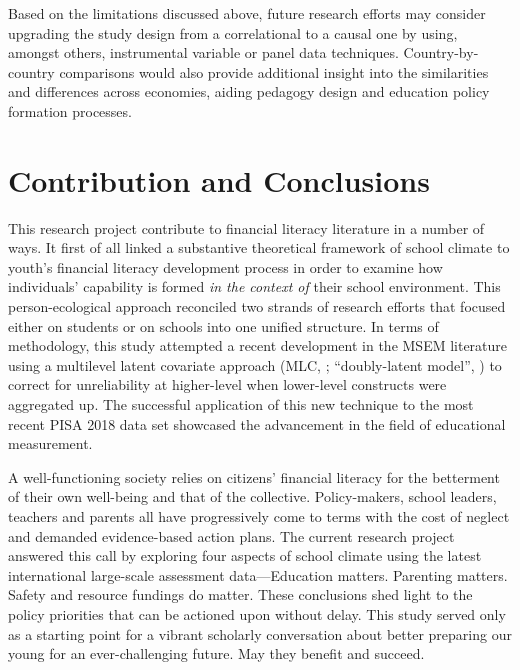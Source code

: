 \documentclass[a4paper,11pt,UKenglish,twoside,openright]{report}\usepackage[]{graphicx}\usepackage[]{color}
\begin{document}
Based on the limitations discussed above, future research efforts may consider upgrading the study design from a correlational to a causal one by using, amongst others, instrumental variable \parencite{pokropek:2016} or panel data \parencite{salasvelasco:2019} techniques. Country-by-country comparisons would also provide additional insight into the similarities and differences across economies, aiding pedagogy design and education policy formation processes.

\section{Contribution and Conclusions}

This research project contribute to financial literacy literature in a number of ways. It first of all linked a substantive theoretical framework of school climate to youth's financial literacy development process in order to examine how individuals' capability is formed \emph{in the context of} their school environment. This person-ecological approach reconciled two strands of research efforts that focused either on students or on schools into one unified structure. In terms of methodology, this study attempted a recent development in the MSEM literature using a multilevel latent covariate approach (MLC, \textcite{ludtke:2008}; ``doubly-latent model'', \textcite{marsh:2009}) to correct for unreliability at higher-level when lower-level constructs were aggregated up. The successful application of this new technique to the most recent PISA 2018 data set showcased the advancement in the field of educational measurement.


A well-functioning society relies on citizens' financial literacy for the betterment of their own well-being and that of the collective. Policy-makers, school leaders, teachers and parents all have progressively come to terms with the cost of neglect and demanded evidence-based action plans. The current research project answered this call by exploring four aspects of school climate using the latest international large-scale assessment data---Education matters. Parenting matters. Safety and resource fundings do matter. These conclusions shed light to the policy priorities that can be actioned upon without delay. This study served only as a starting point for a vibrant scholarly conversation about better preparing our young for an ever-challenging future. May they benefit and succeed.
\end{document}
